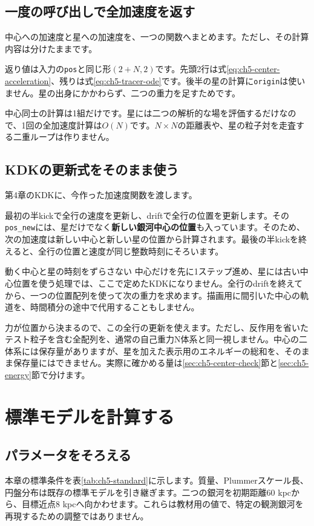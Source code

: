 \subsection{一度の呼び出しで全加速度を返す}
中心への加速度と星への加速度を、一つの関数へまとめます。ただし、その計算内容は分けたままです。

返り値は入力の\texttt{pos}と同じ形$(2+N,2)$です。先頭2行は式\eqref{eq:ch5-center-acceleration}、残りは式\eqref{eq:ch5-tracer-ode}です。後半の星の計算に\texttt{origin}は使いません。星の出身にかかわらず、二つの重力を足すためです。

中心同士の計算は1組だけです。星には二つの解析的な場を評価するだけなので、1回の全加速度計算は$O(N)$です。$N\times N$の距離表や、星の粒子対を走査する二重ループは作りません。

\subsection{KDKの更新式をそのまま使う}
第4章のKDKに、今作った加速度関数を渡します。

最初の半kickで全行の速度を更新し、driftで全行の位置を更新します。その\texttt{pos\_new}には、星だけでなく\textbf{新しい銀河中心の位置}も入っています。そのため、次の加速度は新しい中心と新しい星の位置から計算されます。最後の半kickを終えると、全行の位置と速度が同じ整数時刻にそろいます。

\begin{failbox}{動く中心と星の時刻をずらさない}
中心だけを先に1ステップ進め、星には古い中心位置を使う処理では、ここで定めたKDKになりません。全行のdriftを終えてから、一つの位置配列を使って次の重力を求めます。描画用に間引いた中心の軌道を、時間積分の途中で代用することもしません。
\end{failbox}

力が位置から決まるので、この全行の更新を使えます。ただし、反作用を省いたテスト粒子を含む全配列を、通常の自己重力N体系と同一視しません。中心の二体系には保存量がありますが、星を加えた表示用のエネルギーの総和を、そのまま保存量にはできません。実際に確かめる量は\ref{sec:ch5-center-check}節と\ref{sec:ch5-energy}節で分けます。

\section{標準モデルを計算する}
\label{sec:ch5-standard}
\subsection{パラメータをそろえる}
本章の標準条件を表\ref{tab:ch5-standard}に示します。質量、Plummerスケール長、円盤分布は既存の標準モデルを引き継ぎます。二つの銀河を初期距離60 kpcから、目標近点8 kpcへ向かわせます。これらは教材用の値で、特定の観測銀河を再現するための調整ではありません。

